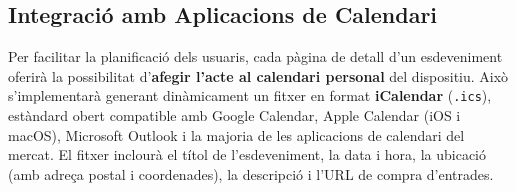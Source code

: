 \subsection{Integració amb Aplicacions de Calendari}

Per facilitar la planificació dels usuaris, cada pàgina de detall d'un esdeveniment oferirà la possibilitat d'\textbf{afegir l'acte al calendari personal} del dispositiu. Això s'implementarà generant dinàmicament un fitxer en format \textbf{iCalendar} (\texttt{.ics}), estàndard obert compatible amb Google Calendar, Apple Calendar (iOS i macOS), Microsoft Outlook i la majoria de les aplicacions de calendari del mercat. El fitxer inclourà el títol de l'esdeveniment, la data i hora, la ubicació (amb adreça postal i coordenades), la descripció i l'URL de compra d'entrades.
